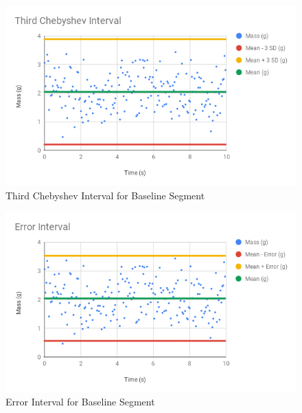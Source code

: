 \begin{figure}
    \begin{center}
        \includegraphics[scale=0.77]{images/00-intro/baseline-chebyshev-3.png}
    \end{center}
    \caption{Third Chebyshev Interval for Baseline Segment}
    \label{figure.baseline.chebyshev.3}
\end{figure}
\begin{figure}
    \begin{center}
        \includegraphics[scale=0.77]{images/00-intro/baseline-error-interval.png}
    \end{center}
    \caption{Error Interval for Baseline Segment}
    \label{figure.baseline.interval}
\end{figure}
